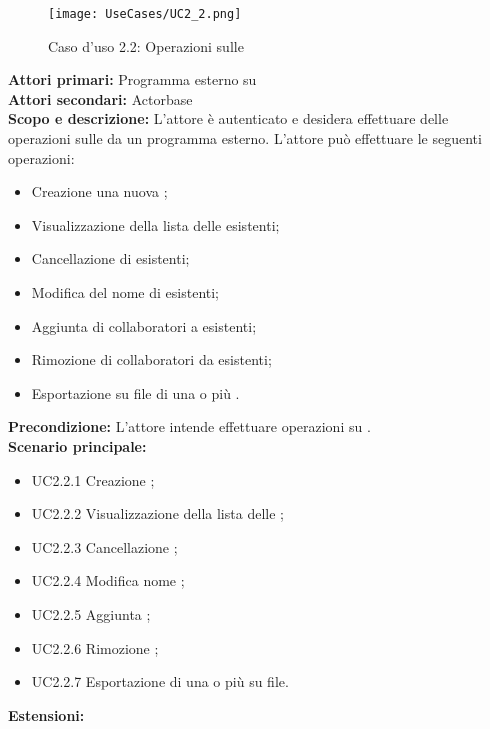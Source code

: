 \documentclass{scalatekids-article}
\begin{document}
\begin{figure}[H]
  \begin{center}
    \texttt{[image: UseCases/UC2\_2.png]}
    \caption*{Caso d'uso 2.2: Operazioni sulle }
  \end{center}
\end{figure}
\textbf{Attori primari:} Programma esterno su \\
\textbf{Attori secondari:} Actorbase\\
\textbf{Scopo e descrizione:} L'attore è autenticato e desidera effettuare delle operazioni sulle  da un programma  esterno. L'attore può effettuare le seguenti operazioni:
\begin{itemize}
\item Creazione una nuova ;
\item Visualizzazione della lista delle  esistenti;
\item Cancellazione di  esistenti;
\item Modifica del nome di  esistenti;
\item Aggiunta di collaboratori a  esistenti;
\item Rimozione di collaboratori da  esistenti;
\item Esportazione su file di una o più .
\end{itemize}
\textbf{Precondizione:} L'attore intende effettuare operazioni su .\\
\textbf{Scenario principale:}
\begin{itemize}
\item UC2.2.1 Creazione ;
\item UC2.2.2 Visualizzazione della lista delle ;
\item UC2.2.3 Cancellazione ;
\item UC2.2.4 Modifica nome ;
\item UC2.2.5 Aggiunta ;
\item UC2.2.6 Rimozione ;
\item UC2.2.7 Esportazione di una o più  su file.
\end{itemize}
\textbf{Estensioni:}
\end{document}
